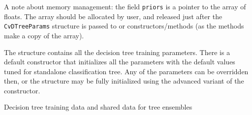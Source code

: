 \begin{description}
{\newline
\newline
A note about memory management: the field \texttt{priors} is a pointer to the array of floats. The array should be allocated by user, and released just after the \texttt{CvDTreeParams} structure is passed to  or  constructors/methods (as the methods make a copy of the array).}
\end{description}

The structure contains all the decision tree training parameters. There is a default constructor that initializes all the parameters with the default values tuned for standalone classification tree. Any of the parameters can be overridden then, or the structure may be fully initialized using the advanced variant of the constructor.



Decision tree training data and shared data for tree ensembles

